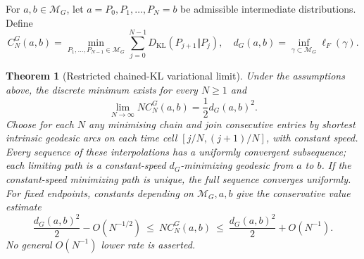 \documentclass[10pt,a4paper]{article}
\newtheorem{theorem}{Theorem}
\newcommand{\KL}{D_{\mathrm{KL}}}
\newcommand{\MM}{\mathcal M_G}
\begin{document}
For $a,b\in\MM$, let $a=P_0,P_1,\ldots,P_N=b$ be admissible intermediate distributions. Define
\begin{equation}\label{eq:chain}
C_N^{G}(a,b)=\min_{P_1,\ldots,P_{N-1}\in\MM}
\sum_{j=0}^{N-1}\KL(P_{j+1}\Vert P_j),
\quad d_G(a,b)=\inf_{\gamma\subset\MM}\ell_F(\gamma).
\end{equation}
\begin{theorem}[Restricted chained-KL variational limit]\label{thm:main}
Under the assumptions above, the discrete minimum exists for every $N\ge1$ and
\begin{equation}\label{eq:main}
\boxed{\displaystyle\lim_{N\to\infty}N C_N^G(a,b)=\frac12d_G(a,b)^2.}
\end{equation}
Choose for each $N$ any minimising chain and join consecutive entries by shortest intrinsic geodesic arcs on each time cell $[j/N,(j+1)/N]$, with constant speed. Every sequence of these interpolations has a uniformly convergent subsequence; each limiting path is a constant-speed $d_G$-minimizing geodesic from $a$ to $b$. If the constant-speed minimizing path is unique, the full sequence converges uniformly. For fixed endpoints, constants depending on $\MM,a,b$ give the conservative value estimate
\begin{equation}\label{eq:rate}
\frac{d_G(a,b)^2}{2}-O(N^{-1/2})\ \le\ N C_N^G(a,b)\ \le\ \frac{d_G(a,b)^2}{2}+O(N^{-1}).
\end{equation}
No general $O(N^{-1})$ \emph{lower} rate is asserted.
\end{theorem}
\end{document}
